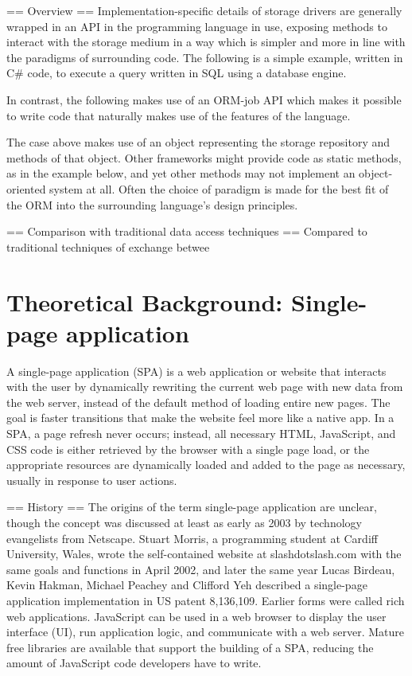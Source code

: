 \documentclass[12pt,a4paper]{report}
\begin{document}
== Overview ==
Implementation-specific details of storage drivers are generally wrapped in an API in the programming language in use, exposing methods to interact with the storage medium in a way which is simpler and more in line with the paradigms of surrounding code.
The following is a simple example, written in C\# code, to execute a query written in SQL using a database engine.

In contrast, the following makes use of an ORM-job API which makes it possible to write code that naturally makes use of the features of the language.

The case above makes use of an object representing the storage repository and methods of that object. Other frameworks might provide code as static methods, as in the example below, and yet other methods may not implement an object-oriented system at all. Often the choice of paradigm is made for the best fit of the ORM into the surrounding language's design principles.


== Comparison with traditional data access techniques ==
Compared to traditional techniques of exchange betwee

\section{Theoretical Background: Single-page application}
A single-page application (SPA) is a web application or website that interacts with the user by dynamically rewriting the current web page with new data from the web server, instead of the default method of loading entire new pages. The goal is faster transitions that make the website feel more like a native app.
In a SPA, a page refresh never occurs; instead, all necessary HTML, JavaScript, and CSS code is either retrieved by the browser with a single page load, or the appropriate resources are dynamically loaded and added to the page as necessary, usually in response to user actions.


== History ==
The origins of the term single-page application are unclear, though the concept was discussed at least as early as 2003 by technology evangelists from Netscape. Stuart Morris, a programming student at Cardiff University, Wales, wrote the self-contained website at slashdotslash.com with the same goals and functions in April 2002, and later the same year Lucas Birdeau, Kevin Hakman, Michael Peachey and Clifford Yeh described a single-page application implementation in US patent 8,136,109. Earlier forms were called rich web applications.
JavaScript can be used in a web browser to display the user interface (UI), run application logic, and communicate with a web server. Mature free libraries are available that support the building of a SPA, reducing the amount of JavaScript code developers have to write.
\end{document}
